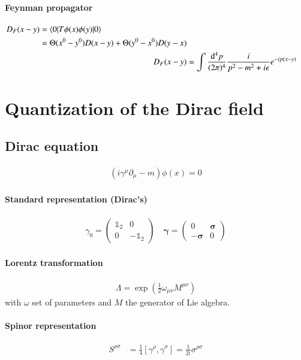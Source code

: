 \documentclass{scrartcl}
\newcommand{\id}{\mathds{1}}
\numberwithin{equation}{section}
\begin{document}
\paragraph{Feynman propagator}
\begin{align}
	\begin{split}
	D_F(x-y) &= \braket{0 | T \phi(x) \phi(y) | 0} \\
			 &= \Theta(x^0 - y^0)D(x-y) + \Theta(y^0 - x^0) D(y-x)
	\end{split}\\
	D_F(x-y) &= \int \frac{\dd^4 p}{(2\pi)^4}\frac{i}{p^2-m^2+i\epsilon} e^{-ip(x-y)}
\end{align}

\section{Quantization of the Dirac field}
\subsection{Dirac equation}
\begin{align}
	\left(i \gamma^\mu \partial_\mu - m \right) \phi(x) = 0
\end{align}
\paragraph{Standard representation (Dirac's)}
\begin{align}
	\gamma_0 = \begin{pmatrix} \id_2 & 0 \\ 0 & -\id_2 \end{pmatrix}
	\quad
	\pmb{\gamma} = \begin{pmatrix} 0 & \pmb{\sigma} \\ -\pmb{\sigma} & 0 \end{pmatrix}
\end{align}
\paragraph{Lorentz transformation}
\begin{align}
	\Lambda = \exp(\frac{1}{2}\omega_{\mu\nu}M^{\mu\nu})
\end{align}
with $\omega$ set of parameters and $M$ the generator of Lie algebra.
\paragraph{Spinor representation}
\begin{align}
	S^{\rho\sigma} &= \frac{1}{4} \left[ \gamma^\rho, \gamma^\sigma \right] = \frac{1}{2i}\sigma^{\rho\sigma} \\
\end{align}
\end{document}
